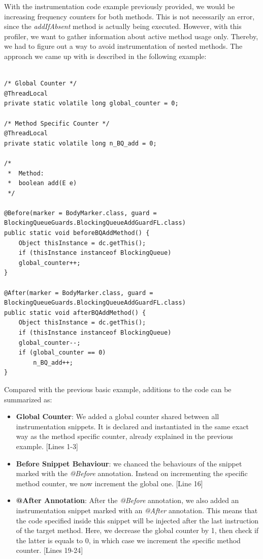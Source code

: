\documentclass[]{usiinfthesis}
\begin{document}
\noindent
With the instrumentation code example previously provided, we would be increasing frequency counters for both methods. This is not necessarily an error, since the \textit{addIfAbsent} method is actually being executed. However, with this profiler, we want to gather information about active method usage only. Thereby, we had to figure out a way to avoid instrumentation of nested methods. The approach we came up with is described in the following example:



\vspace*{0.5cm}
\begin{verbatim}

/* Global Counter */
@ThreadLocal
private static volatile long global_counter = 0;

/* Method Specific Counter */
@ThreadLocal
private static volatile long n_BQ_add = 0;

/*
 *  Method:
 *  boolean add(E e)
 */

@Before(marker = BodyMarker.class, guard = BlockingQueueGuards.BlockingQueueAddGuardFL.class)
public static void beforeBQAddMethod() {
    Object thisInstance = dc.getThis();
    if (thisInstance instanceof BlockingQueue)
    global_counter++;
}

@After(marker = BodyMarker.class, guard = BlockingQueueGuards.BlockingQueueAddGuardFL.class)
public static void afterBQAddMethod() {
    Object thisInstance = dc.getThis();
    if (thisInstance instanceof BlockingQueue)
    global_counter--;
    if (global_counter == 0)
        n_BQ_add++;
}
\end{verbatim}
\vspace*{0.5cm}

Compared with the previous basic example, additions to the code can be summarized as:
\begin{itemize}
    \item \textbf{Global Counter}: We added a global counter shared between all instrumentation snippets. It is declared and instantiated in the same exact way as the method specific counter, already explained in the previous example. [Lines 1-3]
    \item \textbf{Before Snippet Behaviour}: we chanced the behaviours of the snippet marked with the \textit{@Before} annotation. Instead on incrementing the specific method counter, we now increment the global one. [Line 16]
    \item \textbf{@After Annotation}: After the \textit{@Before} annotation, we also added an instrumentation snippet marked with an \textit{@After} annotation. This means that the code specified inside this snippet will be injected after the last instruction of the target method. Here, we decrease the global counter by 1, then check if the latter is equals to 0, in which case we increment the specific method counter. [Lines 19-24]
\end{itemize}
\end{document}
